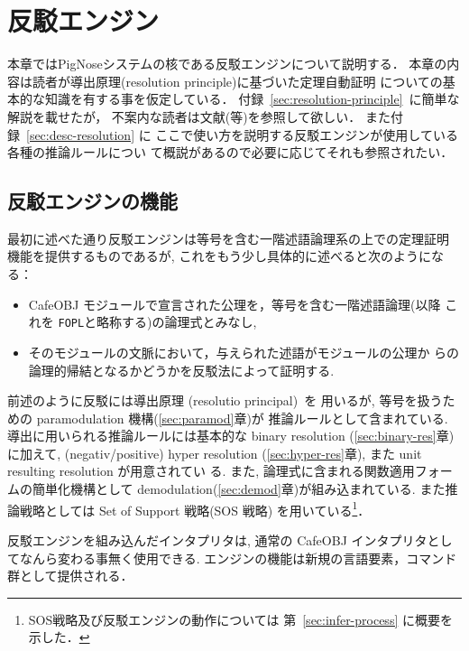 \chapter{反駁エンジン}
\label{sec:intro-refutation-engine}

本章ではPigNoseシステムの核である反駁エンジンについて説明する．
本章の内容は読者が導出原理(resolution principle)に基づいた定理自動証明
についての基本的な知識を有する事を仮定している．
付録~\ref{sec:resolution-principle}~に簡単な解説を載せたが，
不案内な読者は文献(\cite{chang-lee}等)を参照して欲しい．
また付録~\ref{sec:desc-resolution} に
ここで使い方を説明する反駁エンジンが使用している各種の推論ルールについ
て概説があるので必要に応じてそれも参照されたい．

\section{反駁エンジンの機能}
\label{sec:func-abst}

最初に述べた通り反駁エンジンは等号を含む一階述語論理系の上での定理証明
機能を提供するものであるが, これをもう少し具体的に述べると次のようになる：
\begin{itemize}
\item CafeOBJ モジュールで宣言された公理を，等号を含む一階述語論理(以降
  これを \texttt{FOPL}と略称する)の論理式とみなし,  
\item そのモジュールの文脈において，与えられた述語がモジュールの公理か
  らの論理的帰結となるかどうかを反駁法によって証明する.
\end{itemize}

前述のように反駁には導出原理 (resolutio principal)~\cite{chang-lee}を
用いるが, 等号を扱うための paramodulation 機構(\ref{sec:paramod}章)が
推論ルールとして含まれている. 
導出に用いられる推論ルールには基本的な binary resolution
(\ref{sec:binary-res}章) に加えて, (negativ/positive) hyper resolution
(\ref{sec:hyper-res}章), また unit resulting resolution が用意されてい
る. また, 論理式に含まれる関数適用フォームの簡単化機構として
demodulation(\ref{sec:demod}章)が組み込まれている.
また推論戦略としては Set of Support 戦略(SOS 戦略)
を用いている\footnote{SOS戦略及び反駁エンジンの動作については
第~\ref{sec:infer-process} に概要を示した．}．

反駁エンジンを組み込んだインタプリタは, 通常の CafeOBJ インタプリタとし
てなんら変わる事無く使用できる. エンジンの機能は新規の言語要素，コマンド
群として提供される．


